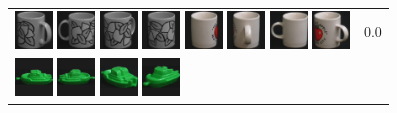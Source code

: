 \begin{figure}[tbp]
\begin{center}
\begin{tabular}{m{11cm} | m{3cm} |}
\includegraphics[width=1cm]{coil/beeld-49.eps} 
\includegraphics[width=1cm]{coil/beeld-51.eps} 
\includegraphics[width=1cm]{coil/beeld-53.eps} 
\includegraphics[width=1cm]{coil/beeld-52.eps} 
\includegraphics[width=1cm]{coil/beeld-38.eps} 
\includegraphics[width=1cm]{coil/beeld-41.eps} 
\includegraphics[width=1cm]{coil/beeld-37.eps} 
\includegraphics[width=1cm]{coil/beeld-40.eps} & {\scriptsize 0.0} \\ 
\includegraphics[width=1cm]{coil/beeld-54.eps} 
\includegraphics[width=1cm]{coil/beeld-55.eps} 
\includegraphics[width=1cm]{coil/beeld-58.eps} 
\includegraphics[width=1cm]{coil/beeld-57.eps} 

\end{tabular}
\end{center}
\end{figure}
